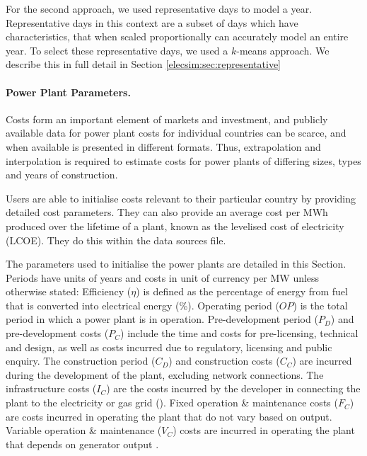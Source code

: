 For the second approach, we used representative days to model a year. Representative days in this context are a subset of days which have characteristics, that when scaled proportionally can accurately model an entire year. To select these representative days, we used a $k$-means approach. We describe this in full detail in Section \ref{elecsim:sec:representative}



\paragraph{Power Plant Parameters.}\label{elecsim:ssssec:powerplantparameters} Costs form an important element of markets and investment, and publicly available data for power plant costs for individual countries can be scarce, and when available is presented in different formats. Thus, extrapolation and interpolation is required to estimate costs for power plants of differing sizes, types and years of construction.

Users are able to initialise costs relevant to their particular country by providing detailed cost parameters. They can also provide an average cost per MWh produced over the lifetime of a plant, known as the levelised cost of electricity (LCOE). They do this within the data sources file.

The parameters used to initialise the power plants are detailed in this Section. Periods have units of years and costs in unit of currency per MW unless otherwise stated: Efficiency ($\eta$) is defined as the percentage of energy from fuel that is converted into electrical energy (\%). Operating period ($OP$) is the total period in which a power plant is in operation. Pre-development period ($P_D$) and pre-development costs ($P_C$) include the time and costs for pre-licensing, technical and design, as well as costs incurred due to regulatory, licensing and public enquiry. The construction period ($C_D$) and construction costs ($C_C$) are incurred during the development of the plant, excluding network connections. The infrastructure costs ($I_C$) are the costs incurred by the developer in connecting the plant to the electricity or gas grid (\textsterling). Fixed operation \& maintenance costs ($F_C$) are costs incurred in operating the plant that do not vary based on output. Variable operation \& maintenance ($V_C$) costs are incurred in operating the plant that depends on generator output \cite{Ltd2016}.



